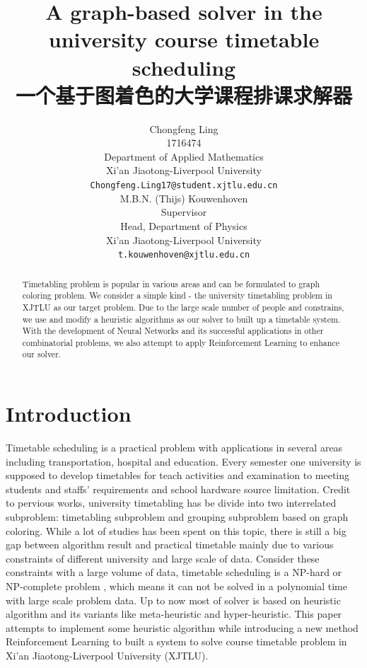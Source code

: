 \documentclass{article}
\title{A graph-based solver in the university course timetable scheduling\\
一个基于图着色的大学课程排课求解器}
\author{ \hspace{1mm}Chongfeng Ling \\
	1716474\\
	Department of Applied Mathematics\\
	Xi'an Jiaotong-Liverpool University\\
	\texttt{Chongfeng.Ling17@student.xjtlu.edu.cn} \\
	\And
	M.B.N. (Thijs) Kouwenhoven \\
	Supervisor \\
	Head, Department of Physics \\
	Xi'an Jiaotong-Liverpool University\\
	\texttt{t.kouwenhoven@xjtlu.edu.cn} \\
}
\begin{document}
\maketitle



\newpage
\tableofcontents
\newpage

\begin{abstract}
	Timetabling problem is popular in various areas and can be formulated to graph coloring problem. We consider a simple kind - the university timetabling problem in XJTLU as our target problem. Due to the large scale number of people and constrains, we use and modify a heuristic algorithms as our solver to built up a timetable system. With the development of Neural Networks and its successful applications in other combinatorial problems, we also attempt to apply Reinforcement Learning to enhance our solver. 
\end{abstract}

\newpage

\section{Introduction}

Timetable scheduling is a practical problem with applications in several areas including transportation, hospital and education. Every semester one university is supposed to develop timetables for teach activities and examination to meeting students and staffs' requirements and school hardware source limitation. Credit to pervious works, university timetabling has be divide into two interrelated subproblem: timetabling subproblem and grouping subproblem based on graph coloring\citep{(hertz1991)tabu}. While a lot of studies has been spent on this topic, there is still a big gap between algorithm result and practical timetable \citep{(mccollum2006)perspective} mainly due to various constraints of different university and large scale of data. Consider these constraints with a large volume of data, timetable scheduling is a NP-hard or NP-complete problem \citep{(even1975)complexity}, which means it can not be solved in a polynomial time with large scale problem data. Up to now most of solver is based on heuristic algorithm and its variants like meta-heuristic and hyper-heuristic. This paper attempts to implement some heuristic algorithm while introducing a new method Reinforcement Learning to built a system to solve course timetable problem in Xi'an Jiaotong-Liverpool University (XJTLU).
\end{document}
